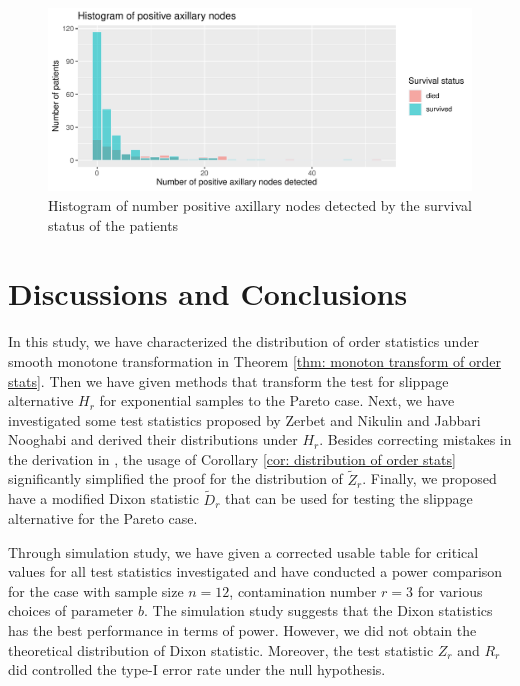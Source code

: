 \documentclass{report}
\begin{document}
\begin{figure}[hbtp]
    {\centering
    \includegraphics[scale = 0.6]{plot_cancer.pdf}
    \caption{\label{Figure: cancer}Histogram of number positive axillary nodes detected by the survival status of the patients}}
\end{figure}



\section{Discussions and Conclusions}

In this study, we have characterized the distribution of order statistics under smooth monotone transformation in Theorem \ref{thm: monoton transform of order stats}.
Then we have given methods that transform the test for slippage alternative $H_r$ for exponential samples to the Pareto case.
Next, we have investigated some test statistics proposed by Zerbet and Nikulin \cite{zerbet2003new} and Jabbari Nooghabi \cite{jabbari2019detecting} and derived their distributions under $H_r$.
Besides correcting mistakes in the derivation in \cite{jabbari2019detecting}, the usage of Corollary \ref{cor: distribution of order stats} significantly simplified the
proof for the distribution of $\tilde Z_r$. Finally, we proposed have a modified Dixon statistic $\tilde D_r$ that can be used for testing the slippage alternative for
the Pareto case.

Through simulation study, we have given a corrected usable table for critical values for all test statistics investigated and have conducted a power comparison for the case
with sample size $n = 12$, contamination number $r =3$ for various choices of parameter $b$. The simulation study suggests that the Dixon statistics has the best
performance in terms of power. However, we did not obtain the theoretical distribution of Dixon statistic. Moreover, the test statistic $Z_r$ and $R_r$ did
controlled the type-I error rate under the null hypothesis.
\end{document}
